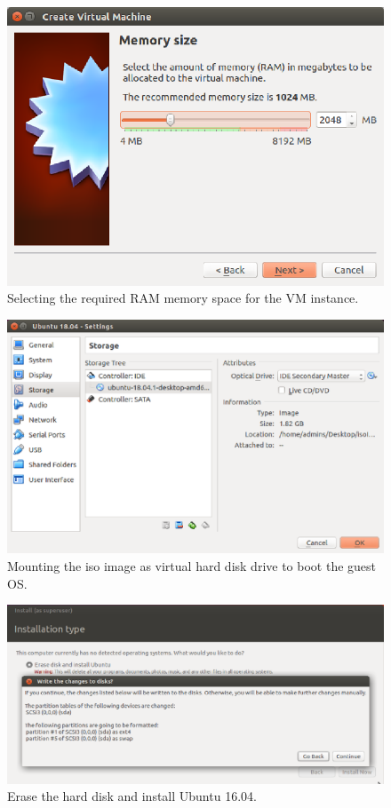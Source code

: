 \documentclass[a4paper,10pt]{article}
\begin{document}
\begin{figure}[h]
	\includegraphics[scale=0.34,center]{fig3.png}
	\caption{Selecting the required RAM memory space for the VM instance.}
	\label{fig:3}
\end{figure}

\newpage
\begin{figure}[h]
	\includegraphics[scale=0.28,center]{fig4.png}
	\caption{Mounting the iso image as virtual hard disk drive to boot the guest OS.}
	\label{fig:4}
\end{figure}

\begin{figure}[h]
	\includegraphics[scale=0.28,center]{fig5.png}
	\caption{Erase the hard disk and install Ubuntu 16.04.}
	\label{fig:5}
\end{figure}
\end{document}
